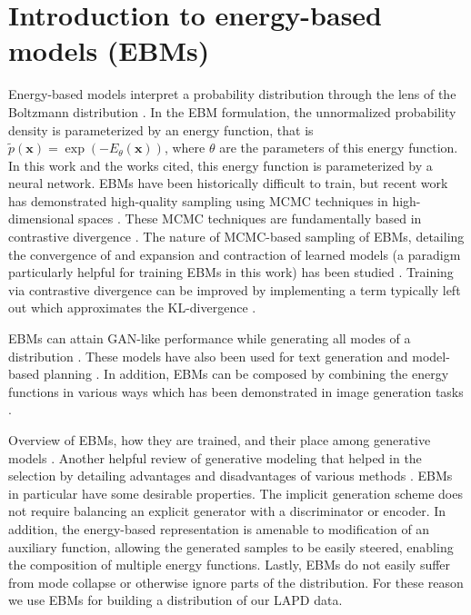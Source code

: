 \section{Introduction to energy-based models (EBMs)}

Energy-based models interpret a probability distribution through the lens of the Boltzmann distribution \cite{hopfield_neural_1982, ackley_learning_1985, lecun_tutorial_2006}. In the EBM formulation, the unnormalized probability density is parameterized by an energy function, that is $\tilde{p}(\mathbf{x}) = \exp(-E_\theta(\mathbf{x}))$, where $\theta$ are the parameters of this energy function. In this work and the works cited, this energy function is parameterized by a neural network. EBMs have been historically difficult to train, but recent work has demonstrated high-quality sampling using MCMC techniques in high-dimensional spaces \cite{du_model_2019, du_implicit_2020, du_improved_2021, du_compositional_2020, du_unsupervised_2021, nijkamp_anatomy_2020, nijkamp_learning_2019, deng_residual_2020, gao_learning_2018}. These MCMC techniques are fundamentally based in contrastive divergence \cite{hinton_training_2002, ruslan_deep_2009, tieleman_training_2008}. The nature of MCMC-based sampling of EBMs, detailing the convergence of and expansion and contraction of learned models (a paradigm particularly helpful for training EBMs in this work) has been studied \cite{nijkamp_anatomy_2020, nijkamp_learning_2019}. Training via contrastive divergence can be improved by implementing a term typically left out which approximates the KL-divergence \cite{du_improved_2021}. 

EBMs can attain GAN-like performance while generating all modes of a distribution \cite{du_implicit_2020}. These models have also been used for text generation \cite{deng_residual_2020} and model-based planning \cite{du_model_2019}. In addition, EBMs can be composed by combining the energy functions in various ways which has been demonstrated in image generation tasks \cite{du_compositional_2020, du_unsupervised_2021}.

Overview of EBMs, how they are trained, and their place among generative models \cite{carbone_hitchhikers_2024}. Another helpful review of generative modeling that helped in the selection by detailing advantages and disadvantages of various methods \cite{bond-taylor_deep_2021}. EBMs in particular have some desirable properties. The implicit generation scheme does not require balancing an explicit generator with a discriminator or encoder. In addition, the energy-based representation is amenable to modification of an auxiliary function, allowing the generated samples to be easily steered, enabling the composition of multiple energy functions. Lastly, EBMs do not easily suffer from mode collapse or otherwise ignore parts of the distribution. For these reason we use EBMs for building a distribution of our LAPD data.

